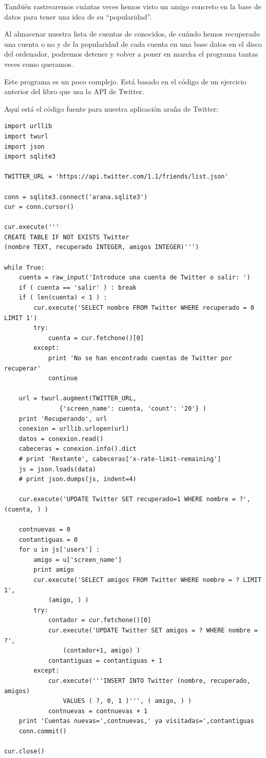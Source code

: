 También rastrearemos cuántas veces hemos visto un amigo concreto en la
base de datos para tener una idea de su ``popularidad''.

Al almacenar nuestra lista de cuentas de conocidos,
de cuándo hemos recuperado una cuenta o no
y de la popularidad de cada cuenta
en una base datos en el disco del ordenador,
podremos detener y volver a poner en marcha el programa tantas veces como queramos. 

Este programa es un poco complejo. Está basado en el código
de un ejercicio anterior del libro que usa la
API de Twitter.

Aquí está el código fuente para nuestra aplicación araña de Twitter:

\beforeverb
\begin{verbatim}
import urllib
import twurl
import json
import sqlite3

TWITTER_URL = 'https://api.twitter.com/1.1/friends/list.json'

conn = sqlite3.connect('arana.sqlite3')
cur = conn.cursor()

cur.execute('''
CREATE TABLE IF NOT EXISTS Twitter 
(nombre TEXT, recuperado INTEGER, amigos INTEGER)''')

while True:
    cuenta = raw_input('Introduce una cuenta de Twitter o salir: ')
    if ( cuenta == 'salir' ) : break
    if ( len(cuenta) < 1 ) :
        cur.execute('SELECT nombre FROM Twitter WHERE recuperado = 0 LIMIT 1')
        try:
            cuenta = cur.fetchone()[0]
        except:
            print 'No se han encontrado cuentas de Twitter por recuperar'
            continue

    url = twurl.augment(TWITTER_URL, 
               {'screen_name': cuenta, 'count': '20'} )
    print 'Recuperando', url
    conexion = urllib.urlopen(url)
    datos = conexion.read()
    cabeceras = conexion.info().dict
    # print 'Restante', cabeceras['x-rate-limit-remaining']
    js = json.loads(data)
    # print json.dumps(js, indent=4)

    cur.execute('UPDATE Twitter SET recuperado=1 WHERE nombre = ?', (cuenta, ) )

    contnuevas = 0
    contantiguas = 0
    for u in js['users'] :
        amigo = u['screen_name']
        print amigo
        cur.execute('SELECT amigos FROM Twitter WHERE nombre = ? LIMIT 1', 
            (amigo, ) )
        try:
            contador = cur.fetchone()[0]
            cur.execute('UPDATE Twitter SET amigos = ? WHERE nombre = ?', 
                (contador+1, amigo) )
            contantiguas = contantiguas + 1
        except:
            cur.execute('''INSERT INTO Twitter (nombre, recuperado, amigos) 
                VALUES ( ?, 0, 1 )''', ( amigo, ) )
            contnuevas = contnuevas + 1
    print 'Cuentas nuevas=',contnuevas,' ya visitadas=',contantiguas
    conn.commit()

cur.close()
\end{verbatim}
